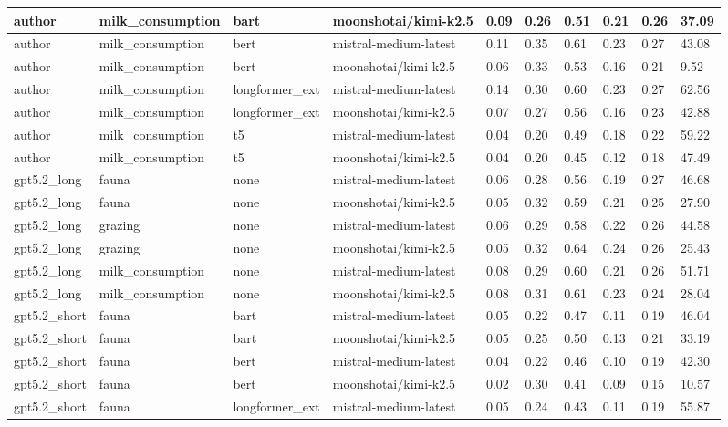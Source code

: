 \begin{tabular}{|l|l|l|l|l|l|l|l|l|l|}
 \hline
 author & milk\_consumption & bart & moonshotai/kimi-k2.5 & 0.09 & 0.26 & 0.51 & 0.21 & 0.26 & 37.09 \\
 \hline
 author & milk\_consumption & bert & mistral-medium-latest & 0.11 & 0.35 & 0.61 & 0.23 & 0.27 & 43.08 \\
 \hline
 author & milk\_consumption & bert & moonshotai/kimi-k2.5 & 0.06 & 0.33 & 0.53 & 0.16 & 0.21 & 9.52 \\
 \hline
 author & milk\_consumption & longformer\_ext & mistral-medium-latest & 0.14 & 0.30 & 0.60 & 0.23 & 0.27 & 62.56 \\
 \hline
 author & milk\_consumption & longformer\_ext & moonshotai/kimi-k2.5 & 0.07 & 0.27 & 0.56 & 0.16 & 0.23 & 42.88 \\
 \hline
 author & milk\_consumption & t5 & mistral-medium-latest & 0.04 & 0.20 & 0.49 & 0.18 & 0.22 & 59.22 \\
 \hline
 author & milk\_consumption & t5 & moonshotai/kimi-k2.5 & 0.04 & 0.20 & 0.45 & 0.12 & 0.18 & 47.49 \\
 \hline
 gpt5.2\_long & fauna & none & mistral-medium-latest & 0.06 & 0.28 & 0.56 & 0.19 & 0.27 & 46.68 \\
 \hline
 gpt5.2\_long & fauna & none & moonshotai/kimi-k2.5 & 0.05 & 0.32 & 0.59 & 0.21 & 0.25 & 27.90 \\
 \hline
 gpt5.2\_long & grazing & none & mistral-medium-latest & 0.06 & 0.29 & 0.58 & 0.22 & 0.26 & 44.58 \\
 \hline
 gpt5.2\_long & grazing & none & moonshotai/kimi-k2.5 & 0.05 & 0.32 & 0.64 & 0.24 & 0.26 & 25.43 \\
 \hline
 gpt5.2\_long & milk\_consumption & none & mistral-medium-latest & 0.08 & 0.29 & 0.60 & 0.21 & 0.26 & 51.71 \\
 \hline
 gpt5.2\_long & milk\_consumption & none & moonshotai/kimi-k2.5 & 0.08 & 0.31 & 0.61 & 0.23 & 0.24 & 28.04 \\
 \hline
 gpt5.2\_short & fauna & bart & mistral-medium-latest & 0.05 & 0.22 & 0.47 & 0.11 & 0.19 & 46.04 \\
 \hline
 gpt5.2\_short & fauna & bart & moonshotai/kimi-k2.5 & 0.05 & 0.25 & 0.50 & 0.13 & 0.21 & 33.19 \\
 \hline
 gpt5.2\_short & fauna & bert & mistral-medium-latest & 0.04 & 0.22 & 0.46 & 0.10 & 0.19 & 42.30 \\
 \hline
 gpt5.2\_short & fauna & bert & moonshotai/kimi-k2.5 & 0.02 & 0.30 & 0.41 & 0.09 & 0.15 & 10.57 \\
 \hline
 gpt5.2\_short & fauna & longformer\_ext & mistral-medium-latest & 0.05 & 0.24 & 0.43 & 0.11 & 0.19 & 55.87 \\

\end{tabular}
